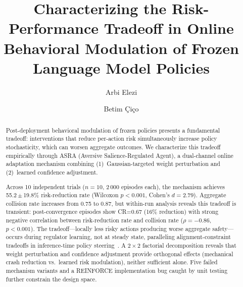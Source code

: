 \documentclass[runningheads]{llncs}
\begin{document}
\title{Characterizing the Risk-Performance Tradeoff in Online Behavioral Modulation of Frozen Language Model Policies}

\author{Arbi Elezi \and
Betim \c{C}i\c{c}o}



\maketitle

\begin{abstract}
Post-deployment behavioral modulation of frozen policies presents a fundamental tradeoff: interventions that reduce per-action risk simultaneously increase policy stochasticity, which can worsen aggregate outcomes. We characterize this tradeoff empirically through ASRA (Aversive Salience-Regulated Agent), a dual-channel online adaptation mechanism combining (1)~Gaussian-targeted weight perturbation and (2)~learned confidence adjustment.

Across 10 independent trials ($n{=}10$, 2\,000 episodes each), the mechanism achieves 55.2\,$\pm$\,19.8\% risk-reduction rate (Wilcoxon $p{<}0.001$, Cohen's $d{=}2.79$). Aggregate collision rate increases from 0.75 to 0.87, but within-run analysis reveals this tradeoff is transient: post-convergence episodes show CR=0.67 (16\% reduction) with strong negative correlation between risk-reduction rate and collision rate ($\rho{=}{-}0.86$, $p{<}0.001$). The tradeoff---locally less risky actions producing worse aggregate safety---occurs during regulator learning, not at steady state, paralleling alignment-constraint tradeoffs in inference-time policy steering~\cite{itps2025}. A $2{\times}2$ factorial decomposition reveals that weight perturbation and confidence adjustment provide orthogonal effects (mechanical crash reduction vs.\ learned risk modulation), neither sufficient alone. Five failed mechanism variants and a REINFORCE implementation bug caught by unit testing further constrain the design space.

\end{abstract}
\end{document}
